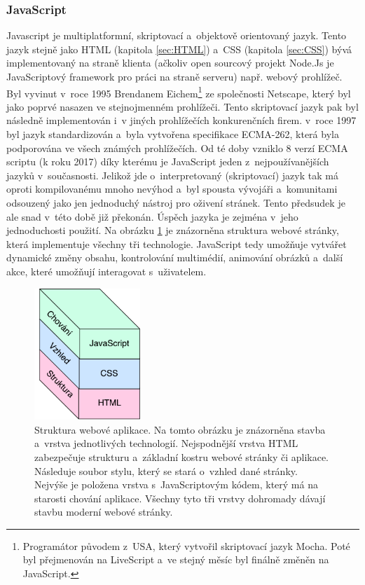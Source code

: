 \subsubsection{JavaScript}
\label{sec:JavaScript}
Javascript je multiplatformní, skriptovací a~objektově orientovaný jazyk. Tento jazyk stejně jako HTML (kapitola \ref{sec:HTML}) a~CSS (kapitola \ref{sec:CSS}) bývá implementovaný na straně klienta (ačkoliv open sourcový projekt Node.Js je JavaScriptový framework pro práci na straně serveru) např. webový prohlížeč. Byl vyvinut v~roce 1995 Brendanem Eichem\footnote{Programátor původem z~USA, který vytvořil skriptovací jazyk Mocha. Poté byl přejmenován na LiveScript a~ve stejný měsíc byl finálně změněn na JavaScript.} ze společnosti Netscape, který byl jako poprvé nasazen ve stejnojmenném prohlížeči. Tento skriptovací jazyk pak byl následně implementován i~v jiných prohlížečích konkurenčních firem. v~roce 1997 byl jazyk standardizován a~byla vytvořena specifikace ECMA-262, která byla podporována ve všech známých prohlížečích. Od té doby vzniklo 8 verzí ECMA scriptu (k roku 2017) díky kterému je JavaScript jeden z~nejpoužívanějších jazyků v~současnosti. Jelikož jde o~interpretovaný (skriptovací) jazyk tak má oproti kompilovanému mnoho nevýhod a~byl spousta vývojáři a~komunitami odsouzený jako jen jednoduchý nástroj pro oživení stránek. Tento předsudek je ale snad v~této době již překonán. Úspěch jazyka je zejména v~jeho jednoduchosti použití. Na obrázku \ref{fig:htmlCssJs} je znázorněna struktura webové stránky, která implementuje všechny tři technologie. JavaScript tedy umožňuje vytvářet dynamické změny obsahu, kontrolování multimédií, animování obrázků a~další akce, které umožňují interagovat s~uživatelem. \\
\begin{figure} [H]
	\centering
	\includegraphics[width=4cm]{../htmlCssJs.pdf}
	\caption{Struktura webové aplikace. Na tomto obrázku je znázorněna stavba a~vrstva jednotlivých technologií. Nejspodnější vrstva HTML zabezpečuje strukturu a~základní kostru webové stránky či aplikace. Následuje soubor stylu, který se stará o~vzhled dané stránky. Nejvýše je položena vrstva s~JavaScriptovým kódem, který má na starosti chování aplikace. Všechny tyto tři vrstvy dohromady dávají stavbu moderní webové stránky.}
	\label{fig:htmlCssJs}
\end{figure}

